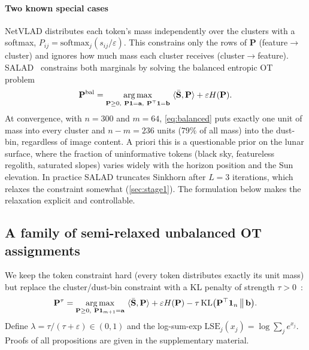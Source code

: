 \paragraph{Two known special cases}
NetVLAD distributes each token's mass independently over the clusters with a softmax,
$P_{ij}=\mathrm{softmax}_j(s_{ij}/\varepsilon)$. This constrains only the rows of $\mathbf{P}$
(feature$\to$cluster) and ignores how much mass each cluster receives
(cluster$\to$feature). SALAD~\cite{izquierdo2024optimal} constrains both marginals by solving the
balanced entropic OT problem~\cite{cuturi2013sinkhorn}
\begin{equation}
\mathbf{P}^{\mathrm{bal}}=\argmax_{\mathbf{P}\ge 0,\ \mathbf{P}\mathbf{1}=\mathbf{a},\ \mathbf{P}^\top\mathbf{1}=\mathbf{b}}
\ \langle\bar{\mathbf{S}},\mathbf{P}\rangle+\varepsilon H(\mathbf{P}).
\label{eq:balanced}
\end{equation}
At convergence, with $n=300$ and $m=64$, \eqref{eq:balanced} puts exactly one unit of mass into
every cluster and $n-m=236$ units ($79\%$ of all mass) into the dust-bin, regardless of image
content. A priori this is a questionable prior on the lunar surface, where the fraction of
uninformative tokens (black sky, featureless regolith, saturated slopes) varies widely with the
horizon position and the Sun elevation. In practice SALAD truncates Sinkhorn after $L=3$
iterations, which relaxes the constraint somewhat (\cref{sec:stage1}). The formulation below makes
the relaxation explicit and controllable.

\subsection{A family of semi-relaxed unbalanced OT assignments}\label{sec:uot}
We keep the token constraint hard (every token distributes exactly its unit mass) but replace
the cluster/dust-bin constraint with a KL penalty of strength $\tau>0$~\cite{chizat2018scaling}:
\begin{equation}
\mathbf{P}^{\tau}=\argmax_{\mathbf{P}\ge 0,\ \mathbf{P}\mathbf{1}_{m+1}=\mathbf{a}}
\ \langle\bar{\mathbf{S}},\mathbf{P}\rangle+\varepsilon H(\mathbf{P})-\tau\,\mathrm{KL}\big(\mathbf{P}^\top\mathbf{1}_n\,\big\|\,\mathbf{b}\big).
\label{eq:uot}
\end{equation}
Define $\lambda=\tau/(\tau+\varepsilon)\in(0,1)$ and the log-sum-exp
$\mathrm{LSE}_j(x_j)=\log\sum_j e^{x_j}$. Proofs of all propositions are given in the supplementary material.

